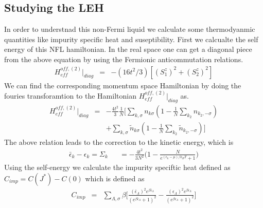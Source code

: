 \documentclass[reprint,prb,superscriptaddress]{revtex4-1}
\begin{document}
\subsection{Studying the LEH}
\noindent In order to understnad this non-Fermi liquid we calculate some thermodyanmic quantities like impurity specific heat and suseptibility. First we calcualte the self energy of this NFL hamiltonian. In the real space one can get a diagonal piece from the above equation by using the Fermionic anticommutation relations.
\begin{eqnarray}
H_{eff}^{off,(2)} |_{diag} &=& -(16t^2/3) [ (S_1^z)^2+ (S_2^z)^2 ]   
\end{eqnarray}
We can find the corresponding momentum space Hamiltonian by doing the fouries transforamtion to the Hamiltonian  $H_{eff}^{off,(2)} |_{diag} $ as.
\begin{eqnarray}
H_{eff}^{off,(2)} |_{diag}&=& -\frac{4t^2}{3} \frac{1}{N} \bigg[ \displaystyle\sum_{k,\sigma} n_{k\sigma}(1-\frac{1}{N} \displaystyle\sum_{k_2}  n_{k_2,-\sigma}  ) \nonumber\\
&&+ \displaystyle\sum_{k,\sigma} \tilde{n}_{k\sigma} ( 1-\frac{1}{N} \displaystyle\sum_{ k_2} \tilde{n}_{k_2,-\sigma}  ) \bigg]  
\end{eqnarray}
The above relation leads to the correction to the kinetic energy, which is
\begin{eqnarray}
\bar{\epsilon}
_k-\epsilon_k=\Sigma_k 
&&= -\frac{4t^2}{3N^2}\bigg(1-\frac{N}{e^{(\epsilon_k-\mu)/k_BT}+1}\bigg)
\label{eq:self-energy-NFL}
\end{eqnarray}
Using the self-energy we calculate the impurity speciftic heat defined as $C_{imp}=C(J^*)-C(0)$ which is defined as
\begin{eqnarray}
C_{imp} &=& \sum_{\Lambda,\sigma} \beta \bigg[ \frac{(\bar{\epsilon}_{\Lambda})^2 e^{\beta \bar{\epsilon}_{\Lambda}}}{( e^{\beta \bar{\epsilon}_{\Lambda}} +1)^2}  -\frac{({\epsilon}_{\Lambda})^2 e^{\beta {\epsilon}_{\Lambda}}}{( e^{\beta {\epsilon}_{\Lambda}} +1)^2} \bigg]
\end{eqnarray}
\end{document}
